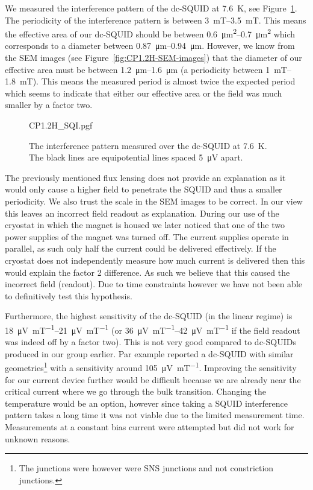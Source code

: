 We measured the interference pattern of the dc-SQUID at \qty{7.6}{\kelvin}, see Figure~\ref{fig:CP1.1H-SQUID-SQI}. The periodicity of the interference pattern is between \qtyrange{3}{3.5}{\milli\tesla}. This means the effective area of our dc-SQUID should be between \qtyrange{0.6}{0.7}{\square\micro\meter} which corresponds to a diameter between \qtyrange{0.87}{0.94}{\micro\meter}. However, we know from the SEM images (see Figure~\ref{fig:CP1.2H-SEM-images}) that the diameter of our effective area must be between \qtyrange{1.2}{1.6}{\micro\meter} (a periodicity between \qtyrange{1}{1.8}{\milli\tesla}). This means the measured period is almost twice the expected period which seems to indicate that either our effective area or the field was much smaller by a factor two.

\begin{figure}[ht!]
	\centering
	{CP1.2H_SQI.pgf}
	\caption{The interference pattern measured over the dc-SQUID at \qty{7.6}{\kelvin}. The black lines are equipotential lines spaced \qty{5}{\micro\volt} apart.}
	\label{fig:CP1.1H-SQUID-SQI}
\end{figure}

The previously mentioned flux lensing\cite{prigozhin3DSimulationSuperconducting2018} does not provide an explanation as it would only cause a higher field to penetrate the SQUID and thus a smaller periodicity. We also trust the scale in the SEM images to be correct. In our view this leaves an incorrect field readout as explanation. During our use of the cryostat in which the magnet is housed we later noticed that one of the two power supplies of the magnet was turned off. The current supplies operate in parallel, as such only half the current could be delivered effectively. If the cryostat does not independently measure how much current is delivered then this would explain the factor 2 difference. As such we believe that this caused the incorrect field (readout). Due to time constraints however we have not been able to definitively test this hypothesis.

Furthermore, the highest sensitivity of the dc-SQUID (in the linear regime) is \qtyrange{18}{21}{\micro\volt\per\milli\tesla} (or \qtyrange{36}{42}{\micro\volt\per\milli\tesla} if the field readout was indeed off by a factor two). This is not very good compared to dc-SQUIDs produced in our group earlier. Par example \citeauthor{rogSQUIDontipMagneticMicroscopy2022} \citeyear{rogSQUIDontipMagneticMicroscopy2022} reported a dc-SQUID with similar geometries\footnote{The junctions were however were SNS junctions and not constriction junctions.} with a sensitivity around \qty{105}{\micro\volt\per\milli\tesla}\cite{rogSQUIDontipMagneticMicroscopy2022}. Improving the sensitivity for our current device further would be difficult because we are already near the critical current where we go through the bulk transition. Changing the temperature would be an option, however since taking a SQUID interference pattern takes a long time it was not viable due to the limited measurement time. Measurements at a constant bias current were attempted but did not work for unknown reasons.

